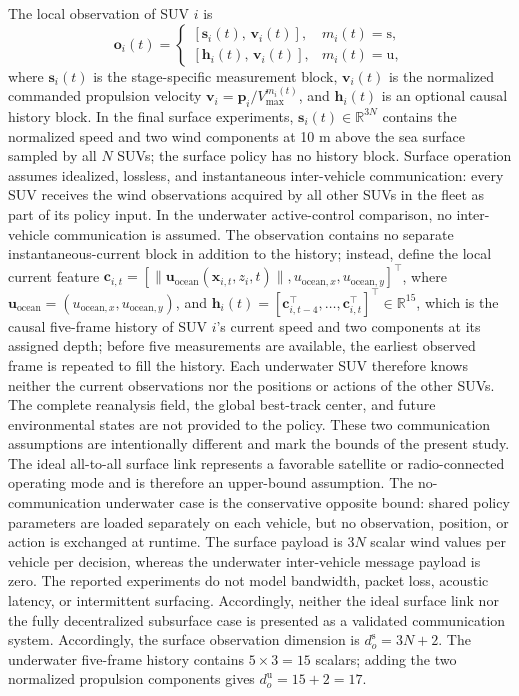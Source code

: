 \documentclass[a4paper,fleqn]{cas-dc}
\begin{document}
The local observation of SUV $i$ is
\begin{equation}
\mathbf{o}_i(t)=
\begin{cases}
\left[\mathbf{s}_i(t),\,\mathbf{v}_i(t)\right],
& m_i(t)=\mathrm{s},\\[1mm]
\left[\mathbf{h}_i(t),\,\mathbf{v}_i(t)\right],
& m_i(t)=\mathrm{u},
\end{cases}
\label{eq:observation}
\end{equation}
where $\mathbf{s}_i(t)$ is the stage-specific measurement block,
$\mathbf{v}_i(t)$ is the normalized commanded propulsion velocity
$\mathbf{v}_i=\mathbf{p}_i/V_{\max}^{m_i(t)}$, and $\mathbf{h}_i(t)$ is an
optional causal history block.
In the final surface experiments,
$\mathbf{s}_i(t)\in\mathbb{R}^{3N}$ contains the normalized speed and two wind
components at 10 m above the sea surface sampled by all $N$ SUVs; the surface
policy has no history block.
Surface operation assumes idealized, lossless, and instantaneous
inter-vehicle communication: every SUV receives the wind observations acquired
by all other SUVs in the fleet as part of its policy input.
In the underwater active-control comparison, no inter-vehicle communication is
assumed. The observation contains no separate instantaneous-current block in
addition to the history; instead,
define the local current feature
$\mathbf{c}_{i,t}=[\|\mathbf{u}_{\mathrm{ocean}}(\mathbf{x}_{i,t},z_i,t)\|,
u_{\mathrm{ocean},x},u_{\mathrm{ocean},y}]^{\top}$, where
$\mathbf{u}_{\mathrm{ocean}}=(u_{\mathrm{ocean},x},
u_{\mathrm{ocean},y})$, and
$\mathbf{h}_i(t)=[\mathbf{c}_{i,t-4}^{\top},\ldots,
\mathbf{c}_{i,t}^{\top}]^{\top}\in\mathbb{R}^{15}$, which is the causal
five-frame history of SUV $i$'s current speed and two components at its
assigned depth; before five measurements are available, the earliest observed
frame is repeated to fill the history.
Each underwater SUV therefore knows neither the current observations nor the
positions or actions of the other SUVs. The complete reanalysis field, the
global best-track center, and future environmental states are not provided to
the policy.
These two communication assumptions are intentionally different and mark the
bounds of the present study. The ideal all-to-all surface link represents a
favorable satellite or radio-connected operating mode and is therefore an
upper-bound assumption. The no-communication underwater case is the
conservative opposite bound: shared policy parameters are loaded separately on
each vehicle, but no observation, position, or action is exchanged at runtime.
The surface payload is $3N$ scalar wind values per vehicle per decision,
whereas the underwater inter-vehicle message payload is zero.
The reported experiments do not model bandwidth, packet loss, acoustic latency,
or intermittent surfacing. Accordingly, neither the ideal surface link nor the
fully decentralized subsurface case is presented as a validated communication
system.
Accordingly, the surface observation dimension is
$d_o^{\mathrm{s}}=3N+2$. The underwater five-frame history contains
$5\times3=15$ scalars; adding the two normalized propulsion components gives
$d_o^{\mathrm{u}}=15+2=17$.
\end{document}

